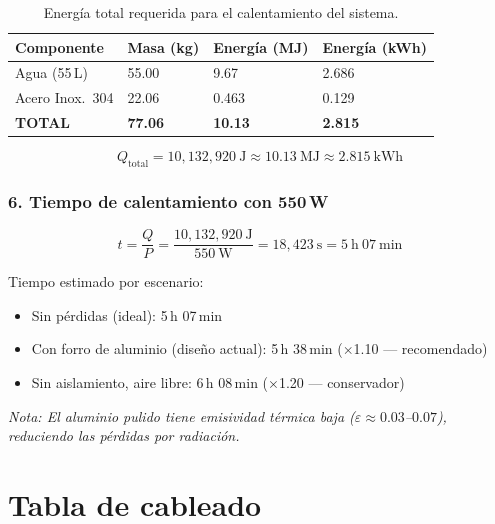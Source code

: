 \begin{table}[H]
\centering
\caption{Energía total requerida para el calentamiento del sistema.}
\label{tab:calor_energia}
\renewcommand{\arraystretch}{1.3}
\small
\begin{tabularx}{\textwidth}{@{} X l l l @{}}
\toprule
\textbf{Componente} & \textbf{Masa (kg)} & \textbf{Energía (MJ)} & \textbf{Energía (kWh)} \\
\midrule
Agua (55\,L) & 55.00 & 9.67 & 2.686 \\
Acero Inox.\ 304 & 22.06 & 0.463 & 0.129 \\
\midrule
\textbf{TOTAL} & \textbf{77.06} & \textbf{10.13} & \textbf{2.815} \\
\bottomrule
\end{tabularx}
\end{table}

\[Q_{\text{total}} = 10{,}132{,}920~\text{J} \approx 10.13~\text{MJ} \approx 2.815~\text{kWh}\]

\subsubsection*{6. Tiempo de calentamiento con 550\,W}

\[t = \frac{Q}{P} = \frac{10{,}132{,}920~\text{J}}{550~\text{W}} = 18{,}423~\text{s} = 5~\text{h}~07~\text{min}\]

\noindent Tiempo estimado por escenario:

\begin{itemize}
  \item Sin pérdidas (ideal): 5\,h 07\,min
  \item Con forro de aluminio (diseño actual): 5\,h 38\,min ($\times$1.10 — recomendado)
  \item Sin aislamiento, aire libre: 6\,h 08\,min ($\times$1.20 — conservador)
\end{itemize}

\noindent\textit{Nota: El aluminio pulido tiene emisividad térmica baja ($\varepsilon \approx 0.03$--$0.07$), reduciendo las pérdidas por radiación.}

\section*{Tabla de cableado}

